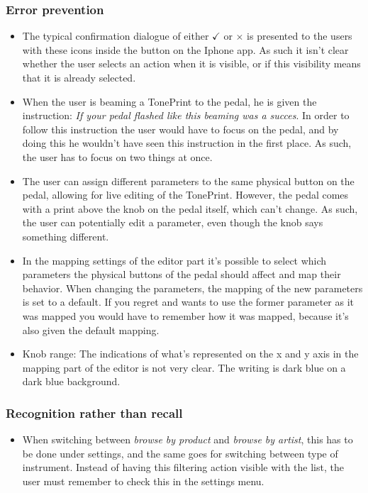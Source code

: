 \subsubsection{Error prevention}
\begin{itemize}
	\item The typical confirmation dialogue of either \textcolor{xGreen}{\textbf{$\checkmark$}} or \textcolor{xRed}{\textbf{$\times$}} is presented to the users with these icons inside the button on the Iphone app. As such it isn’t clear whether the user selects an action when it is visible, or if this visibility means that it is already selected.\\
	\item When the user is beaming a TonePrint to the pedal, he is given the instruction: \textit{If your pedal flashed like this beaming was a succes}. In order to follow this instruction the user would have to focus on the pedal, and by doing this he wouldn't have seen this instruction in the first place. As such, the user has to focus on two things at once.\\
	\item The user can assign different parameters to the same physical button on the pedal, allowing for live editing of the TonePrint. However, the pedal comes with a print above the knob on the pedal itself, which can't change. As such, the user can potentially edit a parameter, even though the knob says something different.\\
	\item In the mapping settings of the editor part it’s possible to select which parameters the physical buttons of the pedal should affect and map their behavior. When changing the parameters, the mapping of the new parameters is set to a default. If you regret and wants to use the former parameter as it was mapped you would have to remember how it was mapped, because it’s also given the default mapping. \\
	\item Knob range: The indications of what’s represented on the x and y axis in the mapping part of the editor is not very clear. The writing is dark blue on a dark blue background.
\end{itemize}
%
\subsubsection{Recognition rather than recall}
\begin{itemize}
	\item When switching between \textit{browse by product} and \textit{browse by artist}, this has to be done under settings, and the same goes for switching between type of instrument. Instead of having this filtering action visible with the list, the user must remember to check this in the settings menu. 
\end{itemize}
%
